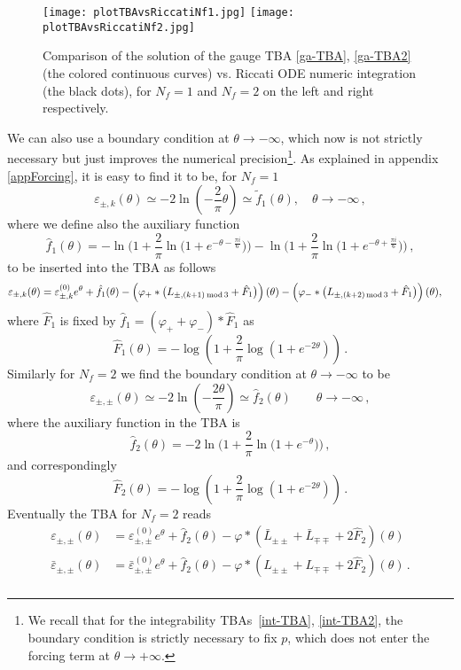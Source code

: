 \documentclass[11pt,a4paper]{elsarticle}
\def \th {\theta}
\def \ve {\varepsilon}
\def \ba {\begin{aligned}}
\def \ea {\end{aligned}}
\newcommand{\be}{\begin{equation}}
\newcommand{\ee}{\end{equation}}
\def\th{\theta}
\numberwithin{figure}{section}
\numberwithin{table}{section}
\begin{document}
\begin{figure} \label{fig:TBARiccati}
\centering
\texttt{[image: plotTBAvsRiccatiNf1.jpg]}
\texttt{[image: plotTBAvsRiccatiNf2.jpg]}
\caption{Comparison of the solution of the gauge TBA \eqref{ga-TBA}, \eqref{ga-TBA2} (the colored continuous curves) vs. Riccati ODE numeric integration (the black dots), for $N_f=1$ and $N_f=2$ on the left and right respectively.} 
\end{figure}


We can also use a boundary condition at $\theta \to - \infty$, which now is not strictly necessary but just improves the numerical precision\footnote{We recall that for the integrability TBAs~\eqref{int-TBA}, \eqref{int-TBA2}, the boundary condition is strictly necessary to fix $p$, which does not enter the forcing term at $\theta \to + \infty$.}. As explained in appendix \ref{appForcing}, it is easy to find it to be, for $N_f=1$
\be\label{ga-bdy-cond}
\ve_{\pm,k}(\theta)\simeq -2 \ln \left(-\frac{2}{\pi}\th \right)\simeq \tilde{f}_1(\theta),\quad \theta \to -\infty\,,%
\ee
where we define also the auxiliary function
\be
\hat{f}_1(\th)=-\ln\Big(1+\frac{2}{\pi}\ln\big(1+e^{-\theta-\frac{\pi i}{6}}\big)\Big)-\ln\Big(1+\frac{2}{\pi}\ln\big(1+e^{-\theta+\frac{\pi i}{6}}\big)\Big)\,,
\ee
to be inserted into the TBA as follows
\be \label{gauTBAbdy}
\ba
\ve_{\pm,k}(\th)&=\ve_{\pm,k}^{(0)}e^{\theta}+\hat{f}_1(\th)-\left(\varphi_{+}\ast\big(L_{\pm,(k+1)\:{\rm mod}\,3}+\hat{F}_1\big)\right)(\th)-\left(\varphi_{-}\ast\big(L_{\pm,(k+2)\,{\rm mod}\,3}+\hat{F}_1\big)\right)(\th),
\ea
\ee
where $\hat{F}_1$ is fixed by $\hat{f}_1=(\varphi_{+}+\varphi_{-})\ast\hat{F}_1$ as
\be
\hat F_1(\theta) = -\log \left(1+\frac{2}{\pi } \log \left(1+ e^{-2\theta}\right)\right)\,.
\ee
Similarly for $N_f=2$ we find the boundary condition at  $\th \to  -\infty$ to be 
\be \label{ga-bdy-cond-2}
\varepsilon_{\pm,\pm}(\th) \simeq -2\ln \left(-\frac{2\th}{\pi} \right)\simeq \hat{f}_2(\th) \qquad \th \to - \infty\,,
\ee
where the auxiliary function in the TBA is
\be
\hat{f}_2(\th)=-2\ln\Big(1+\frac{2}{\pi}\ln\big(1+e^{-\theta}\big)\Big)\,,
\ee
and correspondingly
\be
\hat F_2 (\theta)= -\log \left(1+\frac{2}{\pi } \log \left(1+ e^{-2\theta}\right)\right)\,.
\ee
Eventually the TBA for $N_f=2$ reads
\be \label{ga-TBA2bdy}
\ba 
\varepsilon_{\pm,\pm}(\th)&= \varepsilon_{\pm,\pm}^{(0)} e^{\th}+\hat{f}_2(\th)- \varphi \ast (\bar{L}_{\pm \pm}+ \bar{L}_{\mp \mp}+2\hat F_2)(\th) \\
\bar{\varepsilon}_{\pm,\pm}(\th)&= \bar{\varepsilon}_{\pm,\pm}^{(0)} e^{\th}+\hat{f}_2(\th)- \varphi \ast (L_{\pm \pm}+ L_{\mp \mp}+2\hat F_2)(\th) \,.\\
\ea 
\ee 
\end{document}
